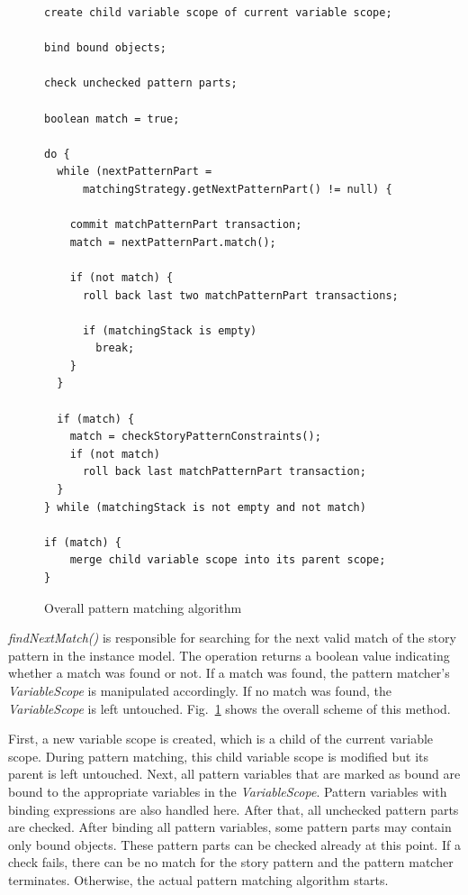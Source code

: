 \begin{figure}[htbp]
\begin{lstlisting}
create child variable scope of current variable scope;

bind bound objects;

check unchecked pattern parts;

boolean match = true;

do {
  while (nextPatternPart = 
      matchingStrategy.getNextPatternPart() != null) {
    
    commit matchPatternPart transaction;
    match = nextPatternPart.match();
    
    if (not match) {
      roll back last two matchPatternPart transactions;
      
      if (matchingStack is empty)
        break;
    }
  }
    
  if (match) {
    match = checkStoryPatternConstraints();
    if (not match)
      roll back last matchPatternPart transaction;
  }
} while (matchingStack is not empty and not match)

if (match) {
	merge child variable scope into its parent scope;
}
\end{lstlisting}
\caption{Overall pattern matching algorithm}
\label{listing:pattern_matcher_execution}
\end{figure}

\emph{findNextMatch()} is responsible for searching for the next valid match of the story pattern in the instance model.
The operation returns a boolean value indicating whether a match was found or not.
If a match was found, the pattern matcher's \emph{VariableScope} is manipulated accordingly.
If no match was found, the \emph{VariableScope} is left untouched.
Fig.~\ref{listing:pattern_matcher_execution} shows the overall scheme of this method.

First, a new variable scope is created, which is a child of the current variable scope.
During pattern matching, this child variable scope is modified but its parent is left untouched.
Next, all pattern variables that are marked as bound are bound to the appropriate variables in the \emph{VariableScope}.
Pattern variables with binding expressions are also handled here.
After that, all unchecked pattern parts are checked.
After binding all pattern variables, some pattern parts may contain only bound objects.
These pattern parts can be checked already at this point.
If a check fails, there can be no match for the story pattern and the pattern matcher terminates.
Otherwise, the actual pattern matching algorithm starts.

